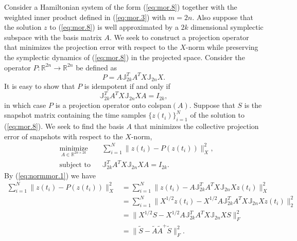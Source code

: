 Consider a Hamiltonian system of the form (\ref{eq:mor.8}) together with the weighted inner product defined in (\ref{eq:mor.3}) with $m=2n$. Also suppose that the solution $z$ to (\ref{eq:mor.8}) is well approximated by a $2k$ dimensional symplectic subspace with the basis matrix $A$. We seek to construct a projection operator that minimizes the projection error with respect to the $X$-norm while preserving the symplectic dynamics of (\ref{eq:mor.8}) in the projected space. Consider the operator $P: \mathbb R^{2n} \to \mathbb R^{2n}$ be defined as
\begin{equation} \label{eq:normmor.1}
	P = A \mathbb J_{2k}^T A^T X \mathbb J_{2n} X.
\end{equation}
It is easy to show that $P$ is idempotent if and only if
\begin{equation} \label{eq:normmor.2}
	\mathbb J_{2k}^T A^T X \mathbb J_{2n} X A = I_{2k},
\end{equation}
in which case $P$ is a projection operator onto colspan$(A)$. Suppose that $S$ is the snapshot matrix containing the time samples $\{z(t_i)\}_{i=1}^N$ of the solution to (\ref{eq:mor.8}). We seek to find the basis $A$ that minimizes the collective projection error of snapshots with respect to the $X$-norm,
\begin{equation} \label{eq:normmor.3}
\begin{aligned}
& \underset{A\in \mathbb{R}^{2n\times 2k}}{\text{minimize}}
& & \sum_{i=1}^N \| z(t_i) - P(z(t_i)) \|_X^2, \\
& \text{subject to}
& & \mathbb J_{2k}^T A^T X \mathbb J_{2n} X A = I_{2k}.
\end{aligned}
\end{equation}
By (\ref{eq:normmor.1}) we have
\begin{equation} \label{eq:normmor.4}
\begin{aligned}
	\sum_{i=1}^N \| z(t_i) - P(z(t_i)) \|_X^2 &= \sum_{i=1}^N \| z(t_i) - A \mathbb J_{2k}^T A^T X \mathbb J_{2n} X z(t_i) \|_X^2 \\
	&= \sum_{i=1}^N \| X^{1/2}z(t_i) - X^{1/2} A \mathbb J_{2k}^T A^T X \mathbb J_{2n} X z(t_i) \|_2^2 \\
	&= \| X^{1/2} S - X^{1/2} A \mathbb J_{2k}^T A^T X \mathbb J_{2n} X S \|_F^2 \\
	&= \| \tilde S - \tilde A \tilde A ^+ \tilde S \|_F^2.
\end{aligned}
\end{equation}
